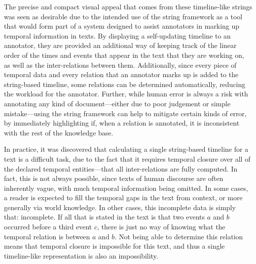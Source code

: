 \documentclass[a4paper,12pt,leqno]{article}
\begin{document}
The precise and compact visual appeal that comes from these timeline-like strings was seen as desirable due to the intended use of the string framework as a tool that would form part of a system designed to assist annotators in marking up temporal information in texts. By displaying a self-updating timeline to an annotator, they are provided an additional way of keeping track of the linear order of the times and events that appear in the text that they are working on, as well as the inter-relations between them. Additionally, since every piece of temporal data and every relation that an annotator marks up is added to the string-based timeline, some relations can be determined automatically, reducing the workload for the annotator. Further, while human error is always a risk with annotating any kind of document---either due to poor judgement or simple mistake---using the string framework can help to mitigate certain kinds of error, by immediately highlighting if, when a relation is annotated, it is inconsistent with the rest of the knowledge base.

In practice, it was discovered that calculating a single string-based timeline for a text is a difficult task, due to the fact that it requires temporal closure over all of the declared temporal entities---that all inter-relations are fully computed. In fact, this is not always possible, since texts of human discourse are often inherently vague, with much temporal information being omitted. In some cases, a reader is expected to fill the temporal gaps in the text from context, or more generally via world knowledge. In other cases, this incomplete data is simply that: incomplete. If all that is stated in the text is that two events $a$ and $b$ occurred before a third event $c$, there is just no way of knowing what the temporal relation is between $a$ and $b$. Not being able to determine this relation means that temporal closure is impossible for this text, and thus a single timeline-like representation is also an impossibility.
\end{document}
